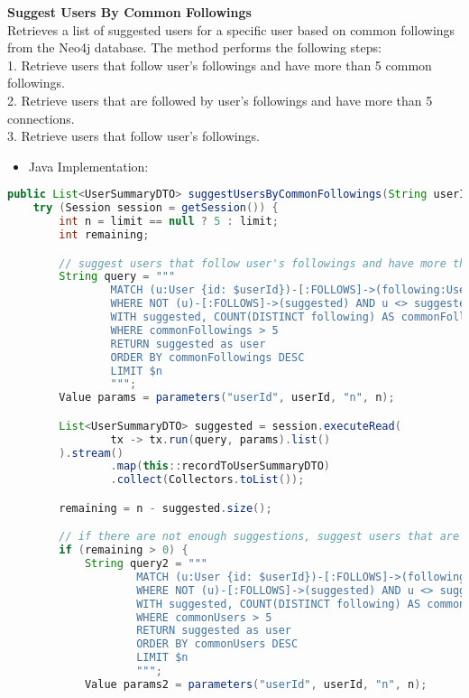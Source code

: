 \textbf{Suggest Users By Common Followings}\\
Retrieves a list of suggested users for a specific user based on common followings from the Neo4j database.
The method performs the following steps:\\
1. Retrieve users that follow user's followings and have more than 5 common followings.\\
2. Retrieve users that are followed by user's followings and have more than 5 connections.\\
3. Retrieve users that follow user's followings.\\
\begin{itemize}
    \item Java Implementation:
\end{itemize}

\begin{mdframed}[style=customstyle]
\begin{lstlisting}[language=java]
public List<UserSummaryDTO> suggestUsersByCommonFollowings(String userId, Integer limit) throws DAOException {
    try (Session session = getSession()) {
        int n = limit == null ? 5 : limit;
        int remaining;

        // suggest users that follow user's followings and have more than 5 common followings
        String query = """
                MATCH (u:User {id: $userId})-[:FOLLOWS]->(following:User)<-[:FOLLOWS]-(suggested:User)
                WHERE NOT (u)-[:FOLLOWS]->(suggested) AND u <> suggested
                WITH suggested, COUNT(DISTINCT following) AS commonFollowings
                WHERE commonFollowings > 5
                RETURN suggested as user
                ORDER BY commonFollowings DESC
                LIMIT $n
                """;
        Value params = parameters("userId", userId, "n", n);

        List<UserSummaryDTO> suggested = session.executeRead(
                tx -> tx.run(query, params).list()
        ).stream()
                .map(this::recordToUserSummaryDTO)
                .collect(Collectors.toList());

        remaining = n - suggested.size();

        // if there are not enough suggestions, suggest users that are followed by the user's followings and have more than 5 connections
        if (remaining > 0) {
            String query2 = """
                    MATCH (u:User {id: $userId})-[:FOLLOWS]->(following:User)-[:FOLLOWS]->(suggested:User)
                    WHERE NOT (u)-[:FOLLOWS]->(suggested) AND u <> suggested
                    WITH suggested, COUNT(DISTINCT following) AS commonUsers
                    WHERE commonUsers > 5
                    RETURN suggested as user
                    ORDER BY commonUsers DESC
                    LIMIT $n
                    """;
            Value params2 = parameters("userId", userId, "n", n);


\end{lstlisting}
\end{mdframed}
